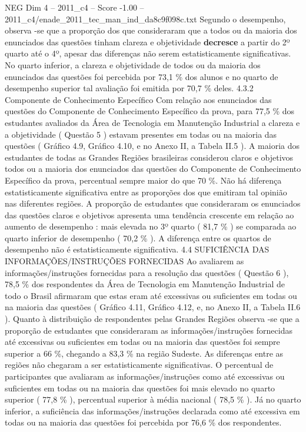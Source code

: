 \begin{textsample}{NEG Dim 4 – 2011\_c4 – Score -1.00 – 2011\_c4/enade\_2011\_tec\_man\_ind\_da8c9f098c.txt}
Segundo o desempenho, observa -se que a proporção dos que consideraram que a todos ou da maioria dos enunciados das questões tinham clareza e objetividade \textbf{decresce} a partir do 2º quarto até o 4º, apesar das diferenças não serem estatisticamente significativas.
No quarto inferior, a clareza e objetividade de todos ou da maioria dos enunciados das questões foi percebida por 73,1 \% dos alunos e no quarto de desempenho superior tal avaliação foi emitida por 70,7 \% deles. 4.3.2 Componente de Conhecimento Específico Com relação aos enunciados das questões do Componente de Conhecimento Específico da prova, para 77,5 \% dos estudantes avaliados da Área de Tecnologia em Manutenção Industrial a clareza e a objetividade ( Questão 5 ) estavam presentes em todas ou na maioria das questões ( Gráfico 4.9, Gráfico 4.10, e no Anexo II, a Tabela II.5 ).
A maioria dos estudantes de todas as Grandes Regiões brasileiras considerou claros e objetivos todos ou a maioria dos enunciados das questões do Componente de Conhecimento Específico da prova, percentual sempre maior do que 70 \%.
Não há diferença estatisticamente significativa entre as proporções dos que emitiram tal opinião nas diferentes regiões.
A proporção de estudantes que consideraram os enunciados das questões claros e objetivos apresenta uma tendência crescente em relação ao aumento de desempenho : mais elevada no 3º quarto ( 81,7 \% ) se comparada ao quarto inferior de desempenho ( 70,2 \% ).
A diferença entre os quartos de desempenho não é estatisticamente significativa. 4.4 SUFICIÊNCIA DAS INFORMAÇÕES/INSTRUÇÕES FORNECIDAS Ao avaliarem as informações/instruções fornecidas para a resolução das questões ( Questão 6 ), 78,5 \% dos respondentes da Área de Tecnologia em Manutenção Industrial de todo o Brasil afirmaram que estas eram até excessivas ou suficientes em todas ou na maioria das questões ( Gráfico 4.11, Gráfico 4.12, e, no Anexo II, a Tabela II.6 ).
Quanto à distribuição de respondentes pelas Grandes Regiões observa -se que a proporção de estudantes que consideraram as informações/instruções fornecidas até excessivas ou suficientes em todas ou na maioria das questões foi sempre superior a 66 \%, chegando a 83,3 \% na região Sudeste.
As diferenças entre as regiões não chegaram a ser estatisticamente significativas.
O percentual de participantes que avaliaram as informações/instruções como até excessivas ou suficientes em todas ou na maioria das questões foi mais elevado no quarto superior ( 77,8 \% ), percentual superior à média nacional ( 78,5 \% ).
Já no quarto inferior, a suficiência das informações/instruções declarada como até excessiva em todas ou na maioria das questões foi percebida por 76,6 \% dos respondentes.

\end{textsample}
